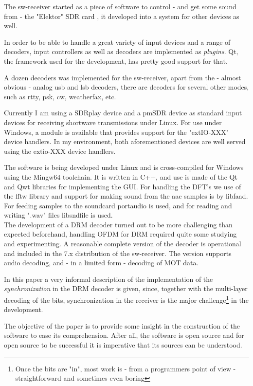 \documentclass[11pt]{article}
\begin{document}
The sw-receiver\cite{swreceiver} 
started as a piece of software to control  - and get some sound from  - the
"Elektor" SDR card \cite{Elektor07},
it developed into a system for other devices as well.

In order to be able to handle a great variety of input devices and
a range of decoders, input controllers  as well as
decoders are implemented as {\em plugins}. Qt, the framework used
for the development, has pretty good support for that.

A dozen decoders was implemented for the sw-receiver,
apart from the - almost obvious - analog usb and lsb decoders,
there are decoders for several other modes, such as rtty, psk, cw, weatherfax,
etc.

Currently
I am using a SDRplay device \cite{sdrPlay} and a pmSDR device \cite{pmSDR}
as  standard input devices for receiving shortwave transmissions under Linux.
For use under Windows, a module is available that provides
support for the "extIO-XXX" \cite{extio} device handlers.
In my environment, both aforementioned devices are well served using the
extio-XXX device handlers.


The software is being developed under Linux and
is cross-compiled for Windows using the Mingw64 toolchain.
It is written in C++, and use is made of the Qt and Qwt libraries
for implementing the GUI. For handling the DFT's we use of
the fftw library\cite{fftw} and support for making sound from the aac samples
is by libfaad\cite{libfaad}. For feeding samples to the soundcard portaudio\cite{portaudio} is used, and for reading and writing ".wav" files libsndfile\cite{libsndfile} is used.
\ \\
The development of a DRM decoder turned out to be more
challenging than expected beforehand, handling OFDM  for DRM
required quite some studying and experimenting.
A  reasonable complete version of the decoder is operational and included
in the 7.x distribution of the sw-receiver.
The version supports audio decoding, and - in a limited form - decoding
of MOT data.

In this paper a very informal description of the implementation
of the {\em synchronization} in the DRM decoder is given, since,
together with the multi-layer decoding of the bits, synchronization in the
receiver is the major challenge\footnote{Once the bits are "in", most work is - from a programmers point of view - straightforward and sometimes even boring}
in the development.

The objective of the paper is to provide some insight in the construction
of the software to ease its comprehension.
After all, the software is open source and for open source
to be successful it is imperative that its sources can be understood.
\end{document}
